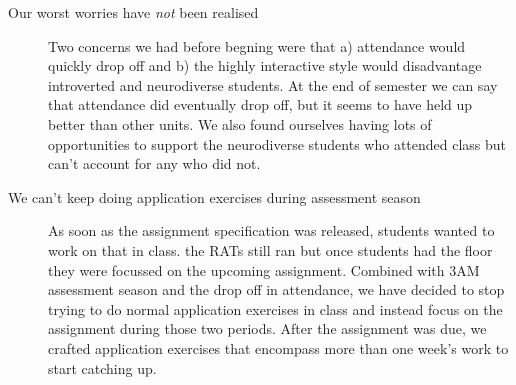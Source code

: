 \documentclass[twoside=false,DIV=14]{scrartcl}
\begin{document}
\begin{description}
\item[Our worst worries have \emph{not} been realised]  Two concerns we had before begning were that a) attendance would quickly drop off and b) the highly interactive style would disadvantage introverted and neurodiverse students.  At the end of semester we can say that attendance did eventually drop off, but it seems to have held up better than other units.  We also found ourselves having lots of opportunities to support the neurodiverse students who attended class but can't account for any who did not.
\item[We can't keep doing application exercises during assessment season] As soon as the assignment specification was released, students wanted to work on that in class.  the RATs still ran but once students had the floor they were focussed on the upcoming assignment.  Combined with 3AM assessment season and the drop off in attendance, we have decided to stop trying to do normal application exercises in class and instead focus on the assignment during those two periods.  After the assignment was due, we crafted application exercises that encompass more than one week's work to start catching up.
\end{description}
\end{document}
